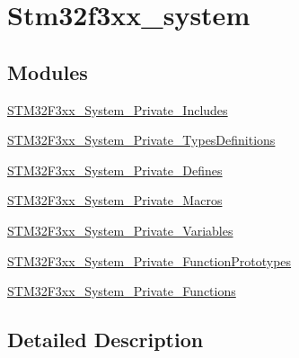 \hypertarget{group__stm32f3xx__system}{}\section{Stm32f3xx\+\_\+system}
\label{group__stm32f3xx__system}
\subsection*{Modules}
\begin{DoxyCompactItemize}
\item 
\hyperlink{group___s_t_m32_f3xx___system___private___includes}{S\+T\+M32\+F3xx\+\_\+\+System\+\_\+\+Private\+\_\+\+Includes}
\item 
\hyperlink{group___s_t_m32_f3xx___system___private___types_definitions}{S\+T\+M32\+F3xx\+\_\+\+System\+\_\+\+Private\+\_\+\+Types\+Definitions}
\item 
\hyperlink{group___s_t_m32_f3xx___system___private___defines}{S\+T\+M32\+F3xx\+\_\+\+System\+\_\+\+Private\+\_\+\+Defines}
\item 
\hyperlink{group___s_t_m32_f3xx___system___private___macros}{S\+T\+M32\+F3xx\+\_\+\+System\+\_\+\+Private\+\_\+\+Macros}
\item 
\hyperlink{group___s_t_m32_f3xx___system___private___variables}{S\+T\+M32\+F3xx\+\_\+\+System\+\_\+\+Private\+\_\+\+Variables}
\item 
\hyperlink{group___s_t_m32_f3xx___system___private___function_prototypes}{S\+T\+M32\+F3xx\+\_\+\+System\+\_\+\+Private\+\_\+\+Function\+Prototypes}
\item 
\hyperlink{group___s_t_m32_f3xx___system___private___functions}{S\+T\+M32\+F3xx\+\_\+\+System\+\_\+\+Private\+\_\+\+Functions}
\end{DoxyCompactItemize}


\subsection{Detailed Description}
